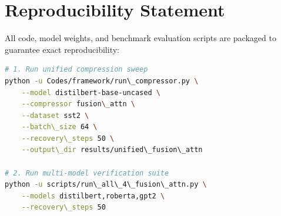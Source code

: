 \section{Reproducibility Statement}
All code, model weights, and benchmark evaluation scripts are packaged to guarantee exact reproducibility:
\begin{lstlisting}[language=bash]
# 1. Run unified compression sweep
python -u Codes/framework/run\_compressor.py \
    --model distilbert-base-uncased \
    --compressor fusion\_attn \
    --dataset sst2 \
    --batch\_size 64 \
    --recovery\_steps 50 \
    --output\_dir results/unified\_fusion\_attn

# 2. Run multi-model verification suite
python -u scripts/run\_all\_4\_fusion\_attn.py \
    --models distilbert,roberta,gpt2 \
    --recovery\_steps 50
\end{lstlisting}

